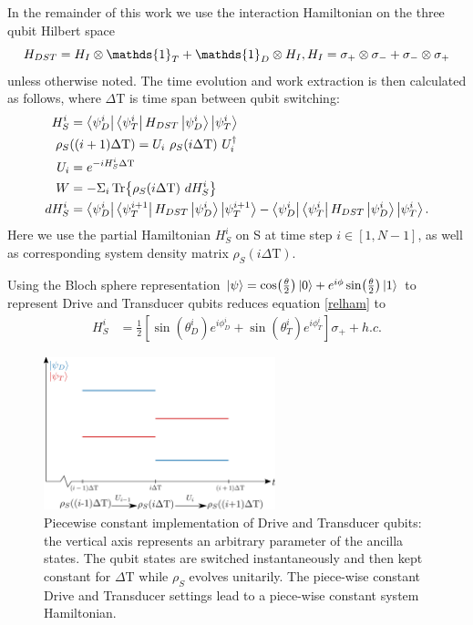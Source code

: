 In the remainder of this work we use the interaction Hamiltonian on the three qubit Hilbert space
\begin{equation*}
H_{DST} = H_{I} \otimes \mathds{1}_T + \mathds{1}_D \otimes H_{I}, \\
H_{I} = \sigma_{+} \otimes \sigma_{-} + \sigma_{-} \otimes \sigma_{+}
\end{equation*}
unless otherwise noted.
The time evolution and work extraction is then calculated as follows, where $\Delta \mathrm{T}$ is time span between qubit switching:
\begin{align}
H_S^i &= \bra{\psi_D^i}\bra{\psi_T^i} H_{DST} \ket{\psi_D^i} \ket{\psi_T^i} \label{relham}\\
\rho_S &((i+1) \Delta \mathrm{T}) = U_i \ \rho_S(i \Delta \mathrm{T}) \ U^{\dagger}_i \\
U_i &= e^{-iH_S^i \Delta \mathrm{T}} \\
W &= - \Sigma_i \Tr{\rho_S(i \Delta \mathrm{T}) \ dH_S^i} \\
dH_S^i &= \bra{\psi_D^i}\bra{\psi_T^{i+1}} H_{DST} \ket{\psi_D^i} \ket{\psi_T^{i+1}} - \bra{\psi_D^i}\bra{\psi_T^i} H_{DST} \ket{\psi_D^i} \ket{\psi_T^i}.	
\end{align}
Here we use the partial Hamiltonian $H_S^i$ on S at time step $i \in [1, N - 1]$, as well as corresponding system density matrix $\rho_S(i \Delta \mathrm{T})$.

Using the Bloch sphere representation $\ket{\psi} = \cos(\frac{\theta}{2}) \ket{0} + e^{i \phi} \sin(\frac{\theta}{2})\ket{1}$ to represent Drive and Transducer qubits reduces equation \ref{relham} to
\begin{align}
	H_S^i &= \frac{1}{2} \left[\sin(\theta_D^i) e^{i\phi_D^i} + \sin(\theta_T^i) e^{i\phi_T^i}\right] \sigma_{+} + h.c.
\end{align}

\begin{figure}
	\centering
	\includegraphics[width=0.6\textwidth]{img/pwc2}
	\caption{Piecewise constant implementation of Drive and Transducer qubits: the vertical axis represents an arbitrary parameter of the ancilla states. The qubit states are switched instantaneously and then kept constant for $\Delta \mathrm{T}$ while $\rho_S$ evolves unitarily. The piece-wise constant Drive and Transducer settings lead to a piece-wise constant system Hamiltonian.}
	\label{pwc}
\end{figure}

